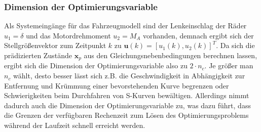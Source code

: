 \subsubsection{Dimension der Optimierungsvariable}
Als Systemeingänge für das Fahrzeugmodell sind der Lenkeinschlag der Räder $u_1=\delta$ und das Motordrehmoment $u_2=M_A$ vorhanden, demnach ergibt sich der Stellgrößenvektor zum Zeitpunkt $k$ zu $\boldsymbol{u}(k)=[u_1(k), u_2(k)]^T$. Da sich die prädizierten Zustände $\boldsymbol{x}_p$ aus den Gleichungsnebenbedingungen berechnen lassen, ergibt sich die Dimension der Optimierungsvariable also zu $2\cdot n_c$.
Je größer man $n_c$ wählt, desto besser lässt sich z.B. die Geschwindigkeit in Abhängigkeit zur Entfernung und Krümmung einer bevorstehenden Kurve begrenzen oder Schwierigkeiten beim Durchfahren von S-Kurven bewältigen. Allerdings nimmt dadurch auch die Dimension der Optimierungsvariable zu, was dazu führt, dass die Grenzen der verfügbaren Rechenzeit zum Lösen des Optimierungsproblems während der Laufzeit schnell erreicht werden.
